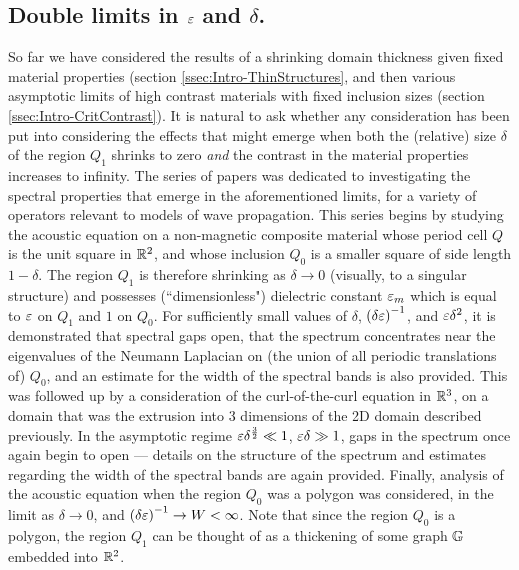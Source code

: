 \subsection{Double limits in $\varepsilon$ and $\delta$.} \label{ssec:Intro-DoubleLimits}
So far we have considered the results of a shrinking domain thickness given fixed material properties (section \ref{ssec:Intro-ThinStructures}, and then various asymptotic limits of high contrast materials with fixed inclusion sizes (section \ref{ssec:Intro-CritContrast}). 
It is natural to ask whether any consideration has been put into considering the effects that might emerge when both the (relative) size $\delta$ of the region $Q_1$ shrinks to zero \emph{and} the contrast in the material properties increases to infinity.
The series of papers \cite{figotin1996band-scalar, figotin1996band-maxwell, figotin1998spectral} was dedicated to investigating the spectral properties that emerge in the aforementioned limits, for a variety of operators relevant to models of wave propagation.
This series begins \cite{figotin1996band-scalar} by studying the acoustic equation on a non-magnetic composite material whose period cell $Q$ is the unit square in $\mathbb{R}^2$, and whose inclusion $Q_0$ is a smaller square of side length $1-\delta$.
The region $Q_1$ is therefore shrinking as $\delta\rightarrow0$ (visually, to a singular structure) and possesses (``dimensionless") dielectric constant $\varepsilon_m$ which is equal to $\varepsilon$ on $Q_1$ and $1$ on $Q_0$.
For sufficiently small values of $\delta$, $\left( \delta\varepsilon \right)^{-1}$, and $\varepsilon\delta^2$, it is demonstrated that spectral gaps open, that the spectrum concentrates near the eigenvalues of the Neumann Laplacian on (the union of all periodic translations of) $Q_0$, and an estimate for the width of the spectral bands is also provided.
This was followed up \cite{figotin1996band-maxwell} by a consideration of the curl-of-the-curl equation in $\mathbb{R}^3$, on a domain that was the extrusion into 3 dimensions of the 2D domain described previously.
In the asymptotic regime $\varepsilon\delta^{\frac{3}{2}}\ll 1$, $\varepsilon\delta\gg1$, gaps in the spectrum once again begin to open --- details on the structure of the spectrum and estimates regarding the width of the spectral bands are again provided.
Finally, analysis of the acoustic equation when the region $Q_0$ was a polygon \cite{figotin1998spectral} was considered, in the limit as $\delta\rightarrow0$, and $\left( \delta\varepsilon \right)^{-1}\rightarrow W<\infty$.
Note that since the region $Q_0$ is a polygon, the region $Q_1$ can be thought of as a thickening of some graph $\mathbb{G}$ embedded into $\mathbb{R}^2$.
